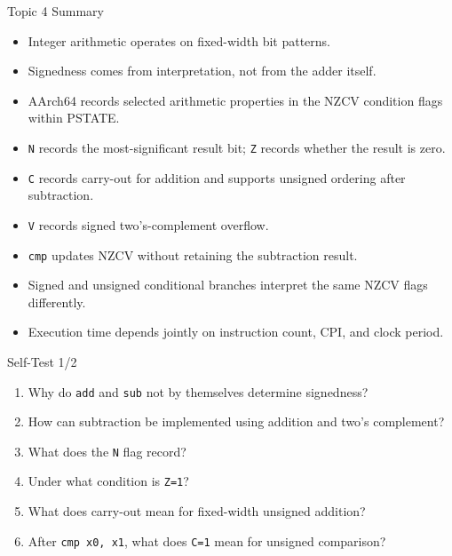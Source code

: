 \documentclass[aspectratio=169,11pt,t]{beamer}
\newcommand{\code}[1]{\texttt{#1}}
\begin{document}
\begin{frame}{Topic 4 Summary}
\begin{itemize}
\item Integer arithmetic operates on fixed-width bit patterns.
\item Signedness comes from interpretation, not from the adder itself.
\item AArch64 records selected arithmetic properties in the NZCV condition flags within PSTATE.
\item \code{N} records the most-significant result bit; \code{Z} records whether the result is zero.
\item \code{C} records carry-out for addition and supports unsigned ordering after subtraction.
\item \code{V} records signed two's-complement overflow.
\item \code{cmp} updates NZCV without retaining the subtraction result.
\item Signed and unsigned conditional branches interpret the same NZCV flags differently.
\item Execution time depends jointly on instruction count, CPI, and clock period.
\end{itemize}
\end{frame}











\begin{frame}{Self-Test 1/2}
\begin{enumerate}
\item Why do \code{add} and \code{sub} not by themselves determine signedness?
\item How can subtraction be implemented using addition and two's complement?
\item What does the \code{N} flag record?
\item Under what condition is \code{Z=1}?
\item What does carry-out mean for fixed-width unsigned addition?
\item After \code{cmp x0, x1}, what does \code{C=1} mean for unsigned comparison?
\end{enumerate}
\end{frame}
\end{document}
